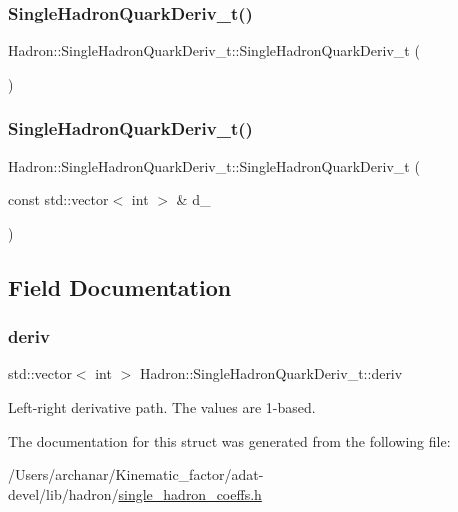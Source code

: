 \subsubsection{\texorpdfstring{SingleHadronQuarkDeriv\_t()}{SingleHadronQuarkDeriv\_t()}\hspace{0.1cm}{\footnotesize\ttfamily [5/6]}}
{\footnotesize\ttfamily Hadron\+::\+Single\+Hadron\+Quark\+Deriv\+\_\+t\+::\+Single\+Hadron\+Quark\+Deriv\+\_\+t (\begin{DoxyParamCaption}{ }\end{DoxyParamCaption})\hspace{0.3cm}{\ttfamily [inline]}}

\mbox{\label{structHadron_1_1SingleHadronQuarkDeriv__t_aa7239c485a6348276814f945fe15139c}} 
\subsubsection{\texorpdfstring{SingleHadronQuarkDeriv\_t()}{SingleHadronQuarkDeriv\_t()}\hspace{0.1cm}{\footnotesize\ttfamily [6/6]}}
{\footnotesize\ttfamily Hadron\+::\+Single\+Hadron\+Quark\+Deriv\+\_\+t\+::\+Single\+Hadron\+Quark\+Deriv\+\_\+t (\begin{DoxyParamCaption}\item[{const std\+::vector$<$ int $>$ \&}]{d\+\_\+ }\end{DoxyParamCaption})\hspace{0.3cm}{\ttfamily [inline]}}



\subsection{Field Documentation}
\mbox{\label{structHadron_1_1SingleHadronQuarkDeriv__t_a20101dafcfaf3f8294f11c87ec3445c6}} 
\subsubsection{\texorpdfstring{deriv}{deriv}}
{\footnotesize\ttfamily std\+::vector$<$ int $>$ Hadron\+::\+Single\+Hadron\+Quark\+Deriv\+\_\+t\+::deriv}

Left-\/right derivative path. The values are 1-\/based. 

The documentation for this struct was generated from the following file\+:\begin{DoxyCompactItemize}
\item 
/\+Users/archanar/\+Kinematic\+\_\+factor/adat-\/devel/lib/hadron/\mbox{\hyperlink{adat-devel_2lib_2hadron_2single__hadron__coeffs_8h}{single\+\_\+hadron\+\_\+coeffs.\+h}}\end{DoxyCompactItemize}
